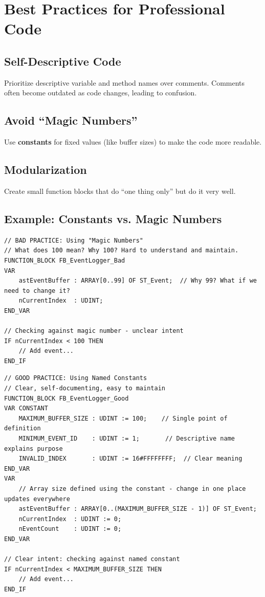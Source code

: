 \documentclass[11pt,a4paper]{article}
\begin{document}
\section{Best Practices for Professional Code}

\subsection{Self-Descriptive Code}

Prioritize descriptive variable and method names over comments. Comments often become outdated as code changes, leading to confusion.

\subsection{Avoid ``Magic Numbers''}

Use \textbf{constants} for fixed values (like buffer sizes) to make the code more readable.

\subsection{Modularization}

Create small function blocks that do ``one thing only'' but do it very well.

\subsection*{Example: Constants vs. Magic Numbers}

\begin{lstlisting}
// BAD PRACTICE: Using "Magic Numbers"
// What does 100 mean? Why 100? Hard to understand and maintain.
FUNCTION_BLOCK FB_EventLogger_Bad
VAR
    astEventBuffer : ARRAY[0..99] OF ST_Event;  // Why 99? What if we need to change it?
    nCurrentIndex  : UDINT;
END_VAR

// Checking against magic number - unclear intent
IF nCurrentIndex < 100 THEN
    // Add event...
END_IF
\end{lstlisting}

\begin{lstlisting}
// GOOD PRACTICE: Using Named Constants
// Clear, self-documenting, easy to maintain
FUNCTION_BLOCK FB_EventLogger_Good
VAR CONSTANT
    MAXIMUM_BUFFER_SIZE : UDINT := 100;    // Single point of definition
    MINIMUM_EVENT_ID    : UDINT := 1;       // Descriptive name explains purpose
    INVALID_INDEX       : UDINT := 16#FFFFFFFF;  // Clear meaning
END_VAR
VAR
    // Array size defined using the constant - change in one place updates everywhere
    astEventBuffer : ARRAY[0..(MAXIMUM_BUFFER_SIZE - 1)] OF ST_Event;
    nCurrentIndex  : UDINT := 0;
    nEventCount    : UDINT := 0;
END_VAR

// Clear intent: checking against named constant
IF nCurrentIndex < MAXIMUM_BUFFER_SIZE THEN
    // Add event...
END_IF
\end{lstlisting}
\end{document}
